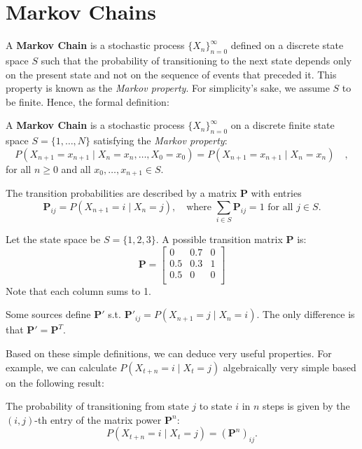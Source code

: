 \documentclass[../../main.tex]{subfiles}
\begin{document}
\section{Markov Chains}

A \textbf{Markov Chain} is a stochastic process $\{X_n\}_{n=0}^\infty$ defined on a discrete state space $S$ such that the probability of transitioning to the next state depends only on the present state and not on the sequence of events that preceded it. This property is known as the \emph{Markov property}. For simplicity's sake, we assume $S$ to be finite. Hence, the formal definition:



\begin{definition}
A \textbf{Markov Chain} is a stochastic process $\{X_n\}_{n=0}^\infty$ on a discrete finite state space $S = \{1, \dots , N\}$ satisfying the \emph{Markov property}:
\[
    P(X_{n+1} = x_{n+1} \mid X_n = x_n, \dots, X_0 = x_0) = P(X_{n+1} = x_{n+1} \mid X_n = x_n) \quad ,
\]
for all $n \geq 0$ and all $x_0, \dots, x_{n+1} \in S$.

\noindent
The transition probabilities are described by a matrix $\bm{P}$ with entries
\[
    \bm{P}_{ij} = P(X_{n+1} = i \mid X_n = j), \quad \text{where } \sum_{i \in S} \bm{P}_{ij} = 1 \text{ for all } j \in S.
\]
\end{definition}


\begin{example}
\label{ex:markov_chain}
Let the state space be $S = \{1, 2, 3\}$. A possible transition matrix $\bm{P}$ is:
\[
\bm{P} =
\begin{bmatrix}
0 & 0.7 & 0 \\
0.5 & 0.3 & 1 \\
0.5 & 0 & 0 \\
\end{bmatrix}
\]
Note that each column sums to 1.
\end{example}


\begin{remark}
    Some sources define $\bm{P'}$ s.t. $\bm{P'}_{ij} = P(X_{n+1} = j \mid X_n = i)$. The only difference is that $\bm{P'} = \bm{P}^T$.
\end{remark}


Based on these simple definitions, we can deduce very useful properties. For example, we can calculate $P(X_{t+n} = i \mid X_t = j)$ algebraically very simple based on the following result:


\begin{lemma}
The probability of transitioning from state $j$ to state $i$ in $n$ steps is given by the $(i,j)$-th entry of the matrix power $\bm{P}^n$:
\[
    P(X_{t+n} = i \mid X_t = j) = (\bm{P}^n)_{ij}.
\]
\end{lemma}
\end{document}
